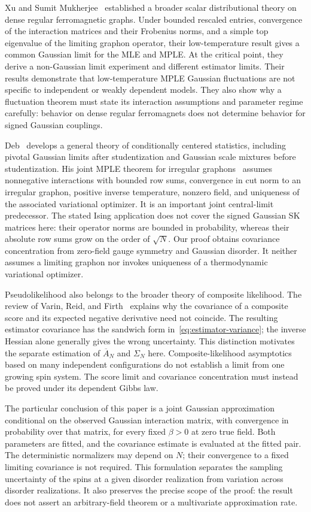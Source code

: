 \documentclass[11pt]{amsart}
\numberwithin{equation}{section}
\theoremstyle{remark}
\begin{document}
Xu and Sumit Mukherjee~\cite{XuMukherjee2023} established a broader scalar distributional theory on dense regular ferromagnetic graphs. Under bounded rescaled entries, convergence of the interaction matrices and their Frobenius norms, and a simple top eigenvalue of the limiting graphon operator, their low-temperature result gives a common Gaussian limit for the MLE and MPLE. At the critical point, they derive a non-Gaussian limit experiment and different estimator limits. Their results demonstrate that low-temperature MPLE Gaussian fluctuations are not specific to independent or weakly dependent models. They also show why a fluctuation theorem must state its interaction assumptions and parameter regime carefully: behavior on dense regular ferromagnets does not determine behavior for signed Gaussian couplings.

Deb~\cite{Deb2025} develops a general theory of conditionally centered statistics, including pivotal Gaussian limits after studentization and Gaussian scale mixtures before studentization. His joint MPLE theorem for irregular graphons~\cite[Theorem~5.2]{Deb2025} assumes nonnegative interactions with bounded row sums, convergence in cut norm to an irregular graphon, positive inverse temperature, nonzero field, and uniqueness of the associated variational optimizer. It is an important joint central-limit predecessor. The stated Ising application does not cover the signed Gaussian SK matrices here: their operator norms are bounded in probability, whereas their absolute row sums grow on the order of $\sqrt N$. Our proof obtains covariance concentration from zero-field gauge symmetry and Gaussian disorder. It neither assumes a limiting graphon nor invokes uniqueness of a thermodynamic variational optimizer.

Pseudolikelihood also belongs to the broader theory of composite likelihood. The review of Varin, Reid, and Firth~\cite[Sections~2.1--2.3]{VarinReidFirth2011} explains why the covariance of a composite score and its expected negative derivative need not coincide. The resulting estimator covariance has the sandwich form in~\eqref{eq:estimator-variance}; the inverse Hessian alone generally gives the wrong uncertainty. This distinction motivates the separate estimation of $\overline A_N$ and $\Sigma_N$ here. Composite-likelihood asymptotics based on many independent configurations do not establish a limit from one growing spin system. The score limit and covariance concentration must instead be proved under its dependent Gibbs law.

The particular conclusion of this paper is a joint Gaussian approximation conditional on the observed Gaussian interaction matrix, with convergence in probability over that matrix, for every fixed $\beta>0$ at zero true field. Both parameters are fitted, and the covariance estimate is evaluated at the fitted pair. The deterministic normalizers may depend on $N$; their convergence to a fixed limiting covariance is not required. This formulation separates the sampling uncertainty of the spins at a given disorder realization from variation across disorder realizations. It also preserves the precise scope of the proof: the result does not assert an arbitrary-field theorem or a multivariate approximation rate.
\end{document}
